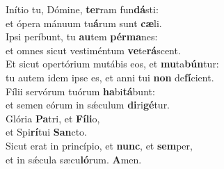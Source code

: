 \evenverse Inítio tu, Dómine, \textbf{ter}ram fun\textbf{dá}sti:~\*\\
\evenverse et ópera mánuum tu\textbf{á}rum sunt \textbf{cæ}li.\\
\oddverse Ipsi períbunt, tu \textbf{au}tem \textbf{pér}\textbf{ma}nes:~\*\\
\oddverse et omnes sicut vestiméntum \textbf{ve}te\textbf{rá}scent.\\
\evenverse Et sicut opertórium mutábis eos, et \textbf{mu}ta\textbf{bún}tur:~\*\\
\evenverse tu autem idem ipse es, et anni tui \textbf{non} de\textbf{fí}cient.\\
\oddverse Fílii servórum tuórum \textbf{ha}bi\textbf{tá}bunt:~\*\\
\oddverse et semen eórum in sǽculum \textbf{di}ri\textbf{gé}tur.\\
\evenverse Glória \textbf{Pa}tri, et \textbf{Fí}\textbf{li}o,~\*\\
\evenverse et Spi\textbf{rí}tui \textbf{San}cto.\\
\oddverse Sicut erat in princípio, et \textbf{nunc}, et \textbf{sem}per,~\*\\
\oddverse et in sǽcula sæcu\textbf{ló}rum. \textbf{A}men.\\
